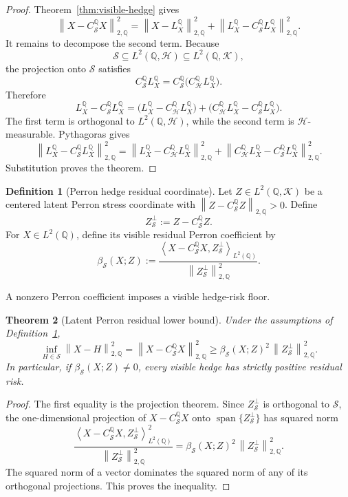 \documentclass[11pt,a4paper]{amsart}
\theoremstyle{plain}
\newtheorem{theorem}{Theorem}[section]
\theoremstyle{definition}
\newtheorem{definition}[theorem]{Definition}
\theoremstyle{remark}
\DeclareMathOperator{\Span}{span}
\newcommand{\QQ}{\mathbb{Q}}
\newcommand{\cH}{\mathcal{H}}
\newcommand{\cK}{\mathcal{K}}
\newcommand{\cS}{\mathcal{S}}
\newcommand{\norm}[1]{\left\lVert #1\right\rVert}
\newcommand{\ip}[2]{\left\langle #1,#2\right\rangle}
\begin{document}
\begin{proof}
Theorem~\ref{thm:visible-hedge} gives
\[
        \norm{X-C_{\cS}^{\QQ}X}_{2,\QQ}^2
        =
        \norm{X-L_X^\QQ}_{2,\QQ}^2
        +
        \norm{L_X^\QQ-C_{\cS}^{\QQ}L_X^\QQ}_{2,\QQ}^2.
\]
It remains to decompose the second term.  Because
\[
        \cS\subseteq L^2(\QQ,\cH)\subseteq L^2(\QQ,\cK),
\]
the projection onto \(\cS\) satisfies
\[
        C_{\cS}^{\QQ}L_X^\QQ
        =
        C_{\cS}^{\QQ}\bigl(C_{\cH}^{\QQ}L_X^\QQ\bigr).
\]
Therefore
\[
        L_X^\QQ-C_{\cS}^{\QQ}L_X^\QQ
        =
        \bigl(L_X^\QQ-C_{\cH}^{\QQ}L_X^\QQ\bigr)
        +
        \bigl(C_{\cH}^{\QQ}L_X^\QQ-C_{\cS}^{\QQ}L_X^\QQ\bigr).
\]
The first term is orthogonal to \(L^2(\QQ,\cH)\), while the second term is
\(\cH\)-measurable.  Pythagoras gives
\[
        \norm{L_X^\QQ-C_{\cS}^{\QQ}L_X^\QQ}_{2,\QQ}^2
        =
        \norm{L_X^\QQ-C_{\cH}^{\QQ}L_X^\QQ}_{2,\QQ}^2
        +
        \norm{C_{\cH}^{\QQ}L_X^\QQ-C_{\cS}^{\QQ}L_X^\QQ}_{2,\QQ}^2.
\]
Substitution proves the theorem.
\end{proof}

\begin{definition}[Perron hedge residual coordinate]\label{def:perron-coordinate}
Let \(Z\in L^2(\QQ,\cK)\) be a centered latent Perron stress coordinate with
\(\norm{Z-C_{\cS}^{\QQ}Z}_{2,\QQ}>0\).  Define
\[
        Z_{\cS}^{\perp}:=Z-C_{\cS}^{\QQ}Z.
\]
For \(X\in L^2(\QQ)\), define its visible residual Perron coefficient by
\[
        \beta_{\cS}(X;Z)
        :=
        \frac{
        \ip{X-C_{\cS}^{\QQ}X}{Z_{\cS}^{\perp}}_{L^2(\QQ)}
        }{
        \norm{Z_{\cS}^{\perp}}_{2,\QQ}^2
        }.
\]
\end{definition}

A nonzero Perron coefficient imposes a visible hedge-risk floor.

\begin{theorem}[Latent Perron residual lower bound]\label{thm:perron-lower-bound}
Under the assumptions of Definition~\ref{def:perron-coordinate},
\[
        \inf_{H\in\cS}\norm{X-H}_{2,\QQ}^2
        =
        \norm{X-C_{\cS}^{\QQ}X}_{2,\QQ}^2
        \ge
        \beta_{\cS}(X;Z)^2\,\norm{Z_{\cS}^{\perp}}_{2,\QQ}^2.
\]
In particular, if \(\beta_{\cS}(X;Z)\ne0\), every visible hedge has strictly positive residual risk.
\end{theorem}

\begin{proof}
The first equality is the projection theorem.  Since \(Z_{\cS}^{\perp}\) is orthogonal to \(\cS\),
the one-dimensional projection of \(X-C_{\cS}^{\QQ}X\) onto \(\Span\{Z_{\cS}^{\perp}\}\) has squared
norm
\[
        \frac{
        \ip{X-C_{\cS}^{\QQ}X}{Z_{\cS}^{\perp}}_{L^2(\QQ)}^2
        }{
        \norm{Z_{\cS}^{\perp}}_{2,\QQ}^2
        }
        =
        \beta_{\cS}(X;Z)^2\,\norm{Z_{\cS}^{\perp}}_{2,\QQ}^2.
\]
The squared norm of a vector dominates the squared norm of any of its orthogonal projections.  This
proves the inequality.
\end{proof}
\end{document}
